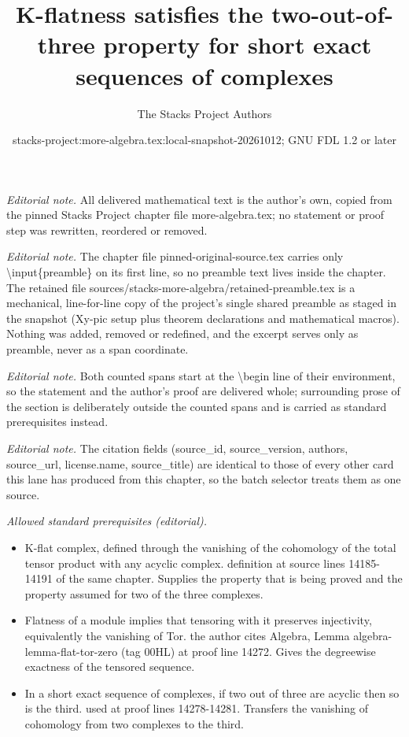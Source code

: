\documentclass[10pt,a4paper]{amsart}
\title{K-flatness satisfies the two-out-of-three property for short exact sequences of complexes}
\author{The Stacks Project Authors}
\date{stacks-project:more-algebra.tex:local-snapshot-20261012; GNU FDL 1.2 or later}
\theoremstyle{plain}
\theoremstyle{definition}
\theoremstyle{remark}
\numberwithin{equation}{subsection}
\begin{document}
\maketitle
\setcounter{subsection}{1}
\noindent\textit{Editorial note.} All delivered mathematical text is the author's own, copied from the pinned Stacks Project chapter file more-algebra.tex; no statement or proof step was rewritten, reordered or removed.\par\medskip
\noindent\textit{Editorial note.} The chapter file pinned-original-source.tex carries only \textbackslash{}input\{preamble\} on its first line, so no preamble text lives inside the chapter. The retained file sources/stacks-more-algebra/retained-preamble.tex is a mechanical, line-for-line copy of the project's single shared preamble as staged in the snapshot (Xy-pic setup plus theorem declarations and mathematical macros). Nothing was added, removed or redefined, and the excerpt serves only as preamble, never as a span coordinate.\par\medskip
\noindent\textit{Editorial note.} Both counted spans start at the \textbackslash{}begin line of their environment, so the statement and the author's proof are delivered whole; surrounding prose of the section is deliberately outside the counted spans and is carried as standard prerequisites instead.\par\medskip
\noindent\textit{Editorial note.} The citation fields (source\_id, source\_version, authors, source\_url, license.name, source\_title) are identical to those of every other card this lane has produced from this chapter, so the batch selector treats them as one source.\par\medskip
\noindent\textit{Allowed standard prerequisites (editorial).}\begin{itemize}
\item K-flat complex, defined through the vanishing of the cohomology of the total tensor product with any acyclic complex. definition at source lines 14185-14191 of the same chapter. Supplies the property that is being proved and the property assumed for two of the three complexes.
\item Flatness of a module implies that tensoring with it preserves injectivity, equivalently the vanishing of Tor. the author cites Algebra, Lemma algebra-lemma-flat-tor-zero (tag 00HL) at proof line 14272. Gives the degreewise exactness of the tensored sequence.
\item In a short exact sequence of complexes, if two out of three are acyclic then so is the third. used at proof lines 14278-14281. Transfers the vanishing of cohomology from two complexes to the third.
\end{itemize}\medskip
\end{document}
